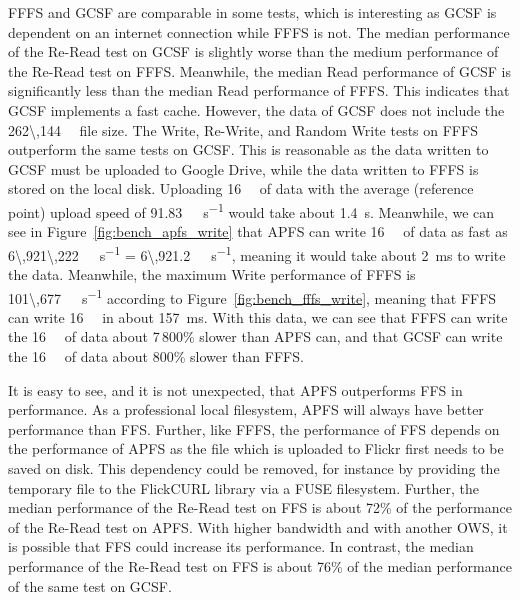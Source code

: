 \gls{FFFS} and \gls{GCSF} are comparable in some tests, which is interesting as \gls{GCSF} is dependent on an internet connection while \gls{FFFS} is not. The median performance of the \mbox{Re-Read} test on \gls{GCSF} is slightly worse than the medium performance of the \mbox{Re-Read} test on \gls{FFFS}. Meanwhile, the median Read performance of \gls{GCSF} is significantly less than the median Read performance of \gls{FFFS}. This indicates that \gls{GCSF} implements a fast cache. However, the data of \gls{GCSF} does not include the \SI{262\,144}{\kilo\byte} file size. The Write, \mbox{Re-Write}, and Random Write tests on \gls{FFFS} outperform the same tests on \gls{GCSF}. This is reasonable as the data written to \gls{GCSF} must be uploaded to Google Drive, while the data written to \gls{FFFS} is stored on the local disk. Uploading \SI{16}{\mega\byte} of data with the average (reference point) upload speed of \SI[per-mode = symbol]{91.83}{\mega\bit\per\second} would take about \SI{1.4}{\second}. Meanwhile, we can see in Figure~\ref{fig:bench_apfs_write} that \gls{APFS} can write \SI{16}{\mega\byte} of data as fast as \SI[per-mode = symbol]{6\,921\,222}{\kilo\byte\per\second} = \SI[per-mode = symbol]{6\,921.2}{\mega\byte\per\second}, meaning it would take about \SI{2}{\milli\second} to write the data. Meanwhile, the maximum Write performance of \gls{FFFS} is \SI[per-mode = symbol]{101\,677}{\kilo\byte\per\second} according to Figure~\ref{fig:bench_fffs_write}, meaning that \gls{FFFS} can write \SI{16}{\mega\byte} in about \SI{157}{\milli\second}. With this data, we can see that \gls{FFFS} can write the \SI{16}{\mega\byte} of data about 7\,800\% slower than \gls{APFS} can, and that \gls{GCSF} can write the \SI{16}{\mega\byte} of data about 800\% slower than \gls{FFFS}. 

It is easy to see, and it is not unexpected, that \gls{APFS} outperforms \gls{FFS} in performance. As a professional local filesystem, \gls{APFS} will always have better performance than FFS. Further, like \gls{FFFS}, the performance of \gls{FFS} depends on the performance of \gls{APFS} as the file which is uploaded to Flickr first needs to be saved on disk. This dependency could be removed, for instance by providing the temporary file to the FlickCURL library via a \gls{FUSE} filesystem. Further, the median performance of the \mbox{Re-Read} test on \gls{FFS} is about 72\% of the performance of the \mbox{Re-Read} test on \gls{APFS}. With higher bandwidth and with another \gls{OWS}, it is possible that \gls{FFS} could increase its performance. In contrast, the median performance of the \mbox{Re-Read} test on \gls{FFS} is about 76\% of the median performance of the same test on \gls{GCSF}.

